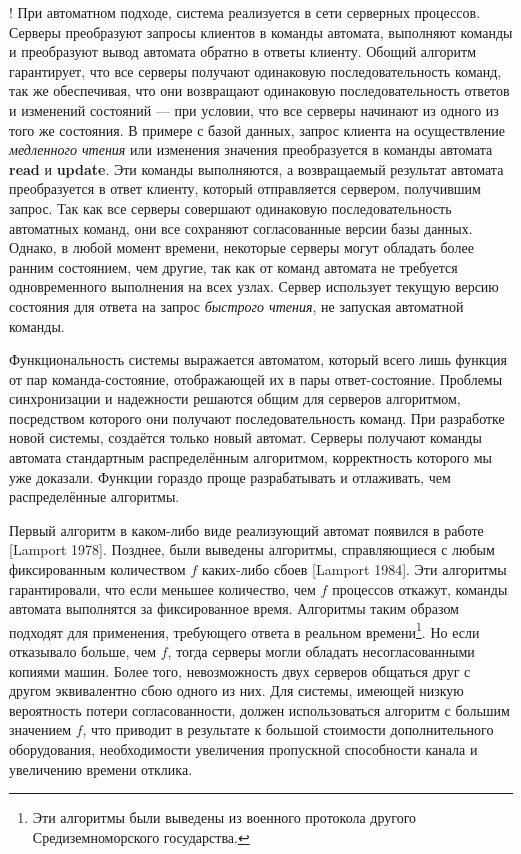 \documentclass[12pt, a4paper]{article} %
\begin{document}
! При автоматном подходе, система реализуется в сети серверных процессов. Серверы преобразуют запросы клиентов в команды автомата, выполняют команды и преобразуют вывод автомата обратно в ответы клиенту. Обощий алгоритм гарантирует, что все серверы получают одинаковую последовательность команд, так же обеспечивая, что они возвращают одинаковую последовательность ответов и изменений состояний --- при условии, что все серверы начинают из одного из того же состояния. В примере с базой данных, запрос клиента на осуществление \textit{медленного чтения} или изменения значения преобразуется в команды автомата \textbf{read} и \textbf{update}. Эти команды выполняются, а возвращаемый результат автомата преобразуется в ответ клиенту, который отправляется сервером, получившим запрос. Так как все серверы совершают одинаковую последовательность автоматных команд, они все сохраняют согласованные версии базы данных. Однако, в любой момент времени, некоторые серверы могут обладать более ранним состоянием, чем другие, так как от команд автомата не требуется одновременного выполнения на всех узлах. Сервер использует текущую версию состояния для ответа на запрос \textit{быстрого чтения}, не запуская автоматной команды.

Функциональность системы выражается автоматом, который всего лишь функция от пар команда-состояние, отображающей их в пары ответ-состояние. Проблемы синхронизации и надежности решаются общим для серверов алгоритмом, посредством которого они получают последовательность команд. При разработке новой системы, создаётся только новый автомат. Серверы получают команды автомата стандартным распределённым алгоритмом, корректность которого мы уже доказали. Функции гораздо проще разрабатывать и отлаживать, чем распределённые алгоритмы.

Первый алгоритм в каком-либо виде реализующий автомат появился в работе [Lamport 1978]. Позднее, были выведены алгоритмы, справляющиеся с любым фиксированным количеством $f$ каких-либо сбоев [Lamport 1984]. Эти алгоритмы гарантировали, что если меньшее количество, чем $f$ процессов откажут, команды автомата выполнятся за фиксированное время. Алгоритмы таким образом подходят для применения, требующего ответа в реальном времени\footnote{Эти алгоритмы были выведены из военного протокола другого Средиземноморского государства.}. Но если отказывало больше, чем $f$, тогда серверы могли обладать несогласованными копиями машин. Более того, невозможность двух серверов общаться друг с другом эквивалентно сбою одного из них. Для системы, имеющей низкую вероятность потери согласованности, должен использоваться алгоритм с большим значением $f$, что приводит в результате к большой стоимости дополнительного оборудования, необходимости увеличения пропускной способности канала и увеличению времени отклика.
\end{document}
